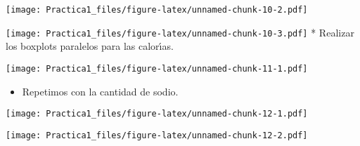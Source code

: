 \documentclass[
]{article}
\newenvironment{Shaded}{\begin{snugshade}}{\end{snugshade}}
\newcommand{\AttributeTok}[1]{\textcolor[rgb]{0.77,0.63,0.00}{#1}}
\newcommand{\FunctionTok}[1]{\textcolor[rgb]{0.00,0.00,0.00}{#1}}
\newcommand{\NormalTok}[1]{#1}
\newcommand{\SpecialCharTok}[1]{\textcolor[rgb]{0.00,0.00,0.00}{#1}}
\newcommand{\StringTok}[1]{\textcolor[rgb]{0.31,0.60,0.02}{#1}}
\providecommand{\tightlist}{%
  \setlength{\itemsep}{0pt}\setlength{\parskip}{0pt}}
\begin{document}
\texttt{[image: Practica1\_files/figure-latex/unnamed-chunk-10-2.pdf]}

\begin{Shaded}
\end{Shaded}

\texttt{[image: Practica1\_files/figure-latex/unnamed-chunk-10-3.pdf]} *
Realizar los boxplots paralelos para las calorı́as.

\begin{Shaded}
\end{Shaded}

\texttt{[image: Practica1\_files/figure-latex/unnamed-chunk-11-1.pdf]}

\begin{itemize}
\tightlist
\item
  Repetimos con la cantidad de sodio.
\end{itemize}

\begin{Shaded}
\end{Shaded}

\texttt{[image: Practica1\_files/figure-latex/unnamed-chunk-12-1.pdf]}

\begin{Shaded}
\end{Shaded}

\texttt{[image: Practica1\_files/figure-latex/unnamed-chunk-12-2.pdf]}
\end{document}
